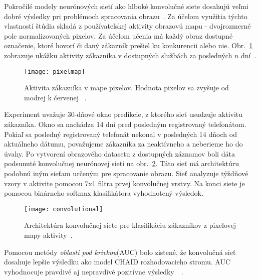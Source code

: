 Pokročilé modely neurónových sietí ako hlboké konvolučné siete dosahujú veľmi dobré výsledky pri problémoch spracovania obrazu~\cite{szegedy2015going}.
Za účelom využitia týchto vlastností štúdia skladá z používateľskej aktivity obrazovú mapu - dvojrozmerné pole normalizovaných pixelov. Za účelom učenia má každý obraz dostupné označenie, ktoré hovorí či daný zákazník prešiel ku konkurencii alebo nie. Obr.~\ref{fig:pixelmap} zobrazuje ukážku aktivity zákazníka v dostupných službách za posledných $n$ dní~\cite{wangperawong2016churn}.

\begin{figure}[H]
\begin{center}
\texttt{[image: pixelmap]}\end{center}
\caption[pixelmap]{Aktivita zákazníka v mape pixelov. Hodnota pixelov sa zvyšuje od modrej k červenej
~\cite{wangperawong2016churn}.}
\label{fig:pixelmap}
\end{figure}

Experiment uvažuje 30-dňové okno predikcie, z ktorého sieť usudzuje aktivitu zákazníka. Okno sa nachádza 14 dní pred posledným registrovaný telefonátom. Pokiaľ sa posledný registrovaný telefonát nekonal v posledných 14 dňoch od aktuálneho dátumu, považujeme zákazníka za neaktívneho a neberieme ho do úvahy.
\newline
Po vytvorení obrazového datasetu z dostupných záznamov boli dáta podsunuté konvolučnej neurónovej sieti na obr.~\ref{fig:convolutional}.
Táto sieť má architektúru podobnú iným sieťam určeným pre spracovanie obrazu. Sieť analyzuje týždňové vzory v aktivite pomocou 7x1 filtra prvej konvolučnej vrstvy. Na konci siete je pomocou binárneho softmax klasifikátora vyhodnotený výsledok.
\newline

\begin{figure}[H]
\begin{center}
\texttt{[image: convolutional]}
\caption[convolutional]{Architektúra konvolučnej siete pre klasifikáciu zákazníkov z pixelovej mapy aktivity~\cite{wangperawong2016churn}.}
\label{fig:convolutional}
\end{center}
\end{figure}

Pomocou metódy \textit{oblasti pod krivkou}(AUC) bolo zistené, že konvolučná sieť dosahuje lepšie výsledku ako model CHAID rozhodovacieho stromu. AUC vyhodnocuje pravdivé aj nepravdivé pozitívne výsledky~\cite{hanley1982meaning}~\cite{bradley1997use}.

